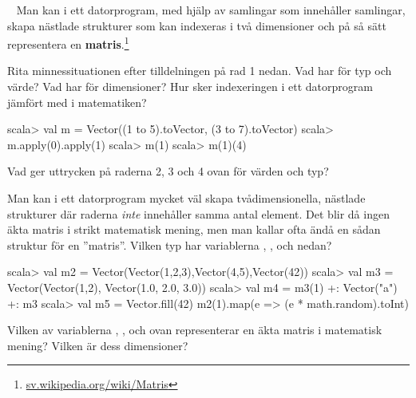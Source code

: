 \TaskSolved \what

\begin{ConceptConnections}

\end{ConceptConnections}

\QUESTEND





\QUESTBEGIN

\Task  \what~  Man kan i ett datorprogram, med hjälp av samlingar som innehåller samlingar, skapa nästlade strukturer som kan indexeras i två dimensioner och på så sätt representera en  \textbf{matris}.\footnote{\href{https://sv.wikipedia.org/wiki/Matris}{sv.wikipedia.org/wiki/Matris}}

\Subtask Rita minnessituationen efter tilldelningen på rad 1 nedan. Vad har  för typ och värde? Vad har  för dimensioner? Hur sker indexeringen i ett datorprogram jämfört med i matematiken?

\begin{REPL}
scala> val m = Vector((1 to 5).toVector, (3 to 7).toVector)
scala> m.apply(0).apply(1)
scala> m(1)
scala> m(1)(4)
\end{REPL}

\Subtask Vad ger uttrycken på raderna 2, 3 och 4 ovan för värden och typ?

\Subtask Man kan i ett datorprogram mycket väl skapa tvådimensionella, nästlade strukturer där raderna \emph{inte} innehåller samma antal element. Det blir då ingen äkta matris i strikt matematisk mening, men man kallar ofta ändå en sådan struktur för en ''matris''. Vilken typ har variablerna , ,  och  nedan?

\begin{REPL}
scala> val m2 = Vector(Vector(1,2,3),Vector(4,5),Vector(42))
scala> val m3 = Vector(Vector(1,2), Vector(1.0, 2.0, 3.0))
scala> val m4 = m3(1) +: Vector("a") +: m3
scala> val m5 = Vector.fill(42){ m2(1).map(e => (e * math.random).toInt) }
\end{REPL}

\Subtask Vilken av variablerna , ,  och  ovan representerar en äkta matris i matematisk mening? Vilken är dess dimensioner?

\SOLUTION

\TaskSolved \what


